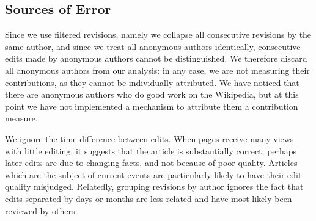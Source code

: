 \subsection{Sources of Error}

Since we use filtered revisions, namely we collapse all consecutive
revisions by the same author, and since we treat all anonymous authors
identically, consecutive edits made by anonymous authors cannot be
distinguished.
We therefore discard all anonymous authors from our analysis: in any
case, we are not measuring their contributions, as they cannot be
individually attributed. 
We have noticed that there are anonymous authors who do good work
on the Wikipedia, but at this point we have not implemented a
mechanism to attribute them a contribution measure.

We ignore the time difference between edits.
When pages receive many views with little editing, it suggests 
that the article is substantially correct;
perhaps later edits are due to changing facts, and not because 
of poor quality.
Articles which are the subject of current events are 
particularly likely to have their edit quality misjudged.
Relatedly, grouping revisions by author ignores the fact that 
edits separated by days or months are less related and have most 
likely been reviewed by others.


